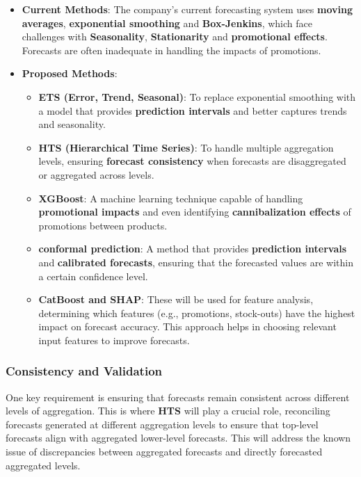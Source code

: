 \documentclass[
  american,
  10,
  a4paper,
]{book}
\theoremstyle{definition}
\theoremstyle{remark}
\begin{document}
\begin{itemize}
\item
  \textbf{Current Methods}: The company's current forecasting system
  uses \textbf{moving averages}, \textbf{exponential smoothing} and
  \textbf{Box-Jenkins}, which face challenges with \textbf{Seasonality},
  \textbf{Stationarity} and \textbf{promotional effects}. Forecasts are
  often inadequate in handling the impacts of promotions.
\item
  \textbf{Proposed Methods}:

  \begin{itemize}
  \item
    \textbf{ETS (Error, Trend, Seasonal)}: To replace exponential
    smoothing with a model that provides \textbf{prediction intervals}
    and better captures trends and seasonality.
  \item
    \textbf{HTS (Hierarchical Time Series)}: To handle multiple
    aggregation levels, ensuring \textbf{forecast consistency} when
    forecasts are disaggregated or aggregated across levels.
  \item
    \textbf{XGBoost}: A machine learning technique capable of handling
    \textbf{promotional impacts} and even identifying
    \textbf{cannibalization effects} of promotions between products.
  \item
    \textbf{conformal prediction}: A method that provides
    \textbf{prediction intervals} and \textbf{calibrated forecasts},
    ensuring that the forecasted values are within a certain confidence
    level.
  \item
    \textbf{CatBoost and SHAP}: These will be used for feature analysis,
    determining which features (e.g., promotions, stock-outs) have the
    highest impact on forecast accuracy. This approach helps in choosing
    relevant input features to improve forecasts.
  \end{itemize}
\end{itemize}

\subsubsection*{Consistency and
Validation}\label{consistency-and-validation}

One key requirement is ensuring that forecasts remain consistent across
different levels of aggregation. This is where \textbf{HTS} will play a
crucial role, reconciling forecasts generated at different aggregation
levels to ensure that top-level forecasts align with aggregated
lower-level forecasts. This will address the known issue of
discrepancies between aggregated forecasts and directly forecasted
aggregated levels.
\end{document}
